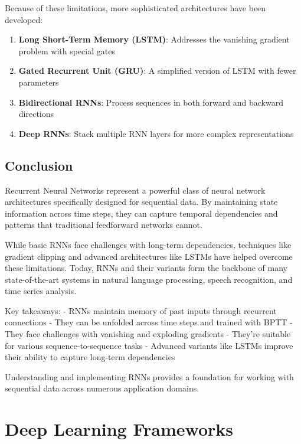 \documentclass[
  letterpaper,
  DIV=11,
  numbers=noendperiod]{scrreprt}
\providecommand{\tightlist}{%
  \setlength{\itemsep}{0pt}\setlength{\parskip}{0pt}}\usepackage{longtable,booktabs,array}
\begin{document}
Because of these limitations, more sophisticated architectures have been
developed:

\begin{enumerate}
\def\labelenumi{\arabic{enumi}.}
\tightlist
\item
  \textbf{Long Short-Term Memory (LSTM)}: Addresses the vanishing
  gradient problem with special gates
\item
  \textbf{Gated Recurrent Unit (GRU)}: A simplified version of LSTM with
  fewer parameters
\item
  \textbf{Bidirectional RNNs}: Process sequences in both forward and
  backward directions
\item
  \textbf{Deep RNNs}: Stack multiple RNN layers for more complex
  representations
\end{enumerate}

\subsection{Conclusion}\label{conclusion-5}

Recurrent Neural Networks represent a powerful class of neural network
architectures specifically designed for sequential data. By maintaining
state information across time steps, they can capture temporal
dependencies and patterns that traditional feedforward networks cannot.

While basic RNNs face challenges with long-term dependencies, techniques
like gradient clipping and advanced architectures like LSTMs have helped
overcome these limitations. Today, RNNs and their variants form the
backbone of many state-of-the-art systems in natural language
processing, speech recognition, and time series analysis.

Key takeaways: - RNNs maintain memory of past inputs through recurrent
connections - They can be unfolded across time steps and trained with
BPTT - They face challenges with vanishing and exploding gradients -
They're suitable for various sequence-to-sequence tasks - Advanced
variants like LSTMs improve their ability to capture long-term
dependencies

Understanding and implementing RNNs provides a foundation for working
with sequential data across numerous application domains.

\section{Deep Learning Frameworks}\label{deep-learning-frameworks}
\end{document}
